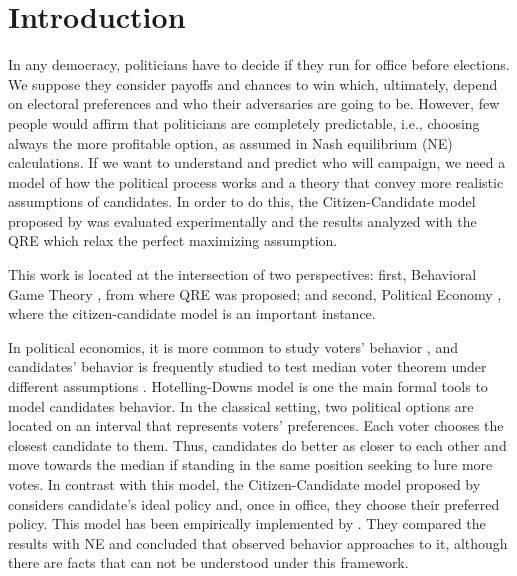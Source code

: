 \section{Introduction}

In any democracy, politicians have to decide if they run for office before elections. We suppose they consider payoffs and chances to win which, ultimately, depend on electoral preferences and who their adversaries are going to be. 
However, few people would affirm that politicians are completely predictable, i.e., choosing always the more profitable option, as assumed in Nash equilibrium (NE) calculations.
If we want to understand and predict who will campaign, we need a model of how the political process works and a theory that convey more realistic assumptions of candidates. 
In order to do this, the Citizen-Candidate model proposed by  was evaluated experimentally and the results analyzed with the QRE \cite{McKelvey1995,Goeree2016} which relax the perfect maximizing assumption.

This work is located at the intersection of two perspectives:
first, Behavioral Game Theory \cite{Camerer2003a, Gachter2004}, from where QRE was proposed; 
and second, Political Economy \cite{Besley2007}, where the citizen-candidate model is an important instance.

In political economics, it is more common to study voters' behavior \cite{Besley2007}, and candidates' behavior is frequently studied to test median voter theorem under different assumptions \cite{Palfrey2009}. 
Hotelling-Downs model is one the main formal tools to model candidates behavior. In the classical setting, two political options are located on an interval that represents voters' preferences. Each voter chooses the closest candidate to them. Thus, candidates do better as closer to each other and move towards the median if standing in the same position seeking to lure more votes.
In contrast with this model, the Citizen-Candidate model proposed by  considers candidate's ideal policy and, once in office, they choose their preferred policy. This model has been empirically implemented by . 
They compared the results with NE and concluded that observed behavior approaches to it, although there are facts that can not be understood under this framework. %

